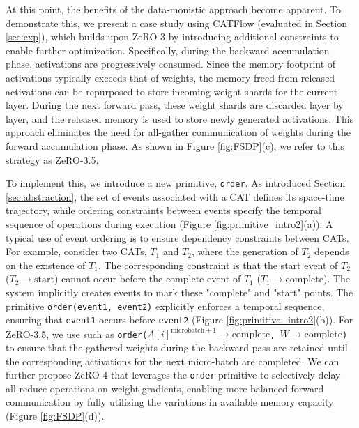 \documentclass[letterpaper,twocolumn,10pt]{article}
\newcommand{\name}{CATFlow}
\begin{document}
At this point, the benefits of the data-monistic approach become apparent. To demonstrate this, we present a case study using \name{} (evaluated in Section \ref{sec:exp}), which builds upon ZeRO-3 by introducing additional constraints to enable further optimization. Specifically, during the backward accumulation phase, activations are progressively consumed. Since the memory footprint of activations typically exceeds that of weights, the memory freed from released activations can be repurposed to store incoming weight shards for the current layer. During the next forward pass, these weight shards are discarded layer by layer, and the released memory is used to store newly generated activations. This approach eliminates the need for all-gather communication of weights during the forward accumulation phase. As shown in Figure \ref{fig:FSDP}(c), we refer to this strategy as ZeRO-3.5. 

To implement this, we introduce a new primitive, \texttt{order}. As introduced Section \ref{sec:abstraction}, the set of events associated with a CAT defines its space-time trajectory, while ordering constraints between events specify the temporal sequence of operations during execution (Figure \ref{fig:primitive_intro2}(a)). A typical use of event ordering is to ensure dependency constraints between CATs. For example, consider two CATs, $T_1$ and $T_2$, where the generation of $T_2$ depends on the existence of $T_1$. The corresponding constraint is that the start event of $T_2$ ($T_2\rightarrow\mathrm{start}$) cannot occur before the complete event of $T_1$ ($T_1\rightarrow\mathrm{complete}$). The system implicitly creates events to mark these "complete" and "start" points. The primitive \texttt{order(event1, event2)} explicitly enforces a temporal sequence, ensuring that \texttt{event1} occurs before \texttt{event2} (Figure \ref{fig:primitive_intro2}(b)). For ZeRO-3.5, we use such as \texttt{order($A[i]^{\mathrm{microbatch}+1}\rightarrow\mathrm{complete}$, $W\rightarrow\mathrm{complete}$)} to ensure that the gathered weights during the backward pass are retained until the corresponding activations for the next micro-batch are completed. We can further propose ZeRO-4 that leverages the \texttt{order} primitive to selectively delay all-reduce operations on weight gradients, enabling more balanced forward communication by fully utilizing the variations in available memory capacity (Figure \ref{fig:FSDP}(d)).
\end{document}
